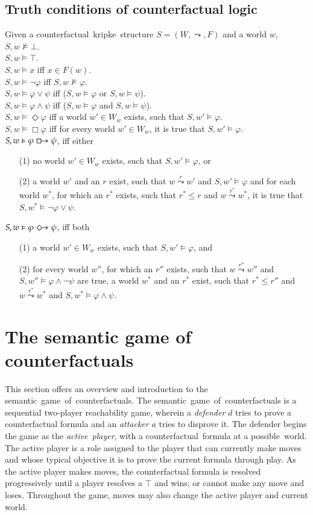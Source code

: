 \documentclass[a4paper,american]{paper}
\theoremstyle{definition}\newtheorem{definition}{Definition}
\begin{document}
\subsection{Truth conditions of counterfactual logic}
Given a counterfactual~kripke~structure $S = (W, \leadsto ,F)$ and a world $w$,\\
$S,w\nvDash\bot$.\\
$S,w\vDash\top$.\\
$S,w\vDash x$ iff $x\in F(w)$.\\
$S,w\vDash \neg\varphi$ iff $S,w\nvDash\varphi$.\\
$S,w\vDash \varphi\vee\psi$ iff ($S,w\vDash\varphi$ or $S,w\vDash\psi$).\\
$S,w\vDash \varphi\wedge\psi$ iff ($S,w\vDash\varphi$ and $S,w\vDash\psi$).\\
$S,w\vDash \Diamond \varphi$ iff a world $w'\in W_w$ exists, such that $S,w' \vDash \varphi$.\\
$S,w\vDash \Box \varphi$ iff for every world $w'\in W_w$, it is true that $S,w' \vDash \varphi$.\\
$S,w \vDash \varphi \boxright \psi$, iff either
\begin{itemize}
	\item[(1)] no world $w'\in W_w$ exists, such that $S,w' \vDash \varphi$, or
	\item[(2)] a world $w'$ and an $r$ exist, such that $w\overset{r}{\leadsto} w'$ and $S,w'\vDash \varphi$ and for each world $w^*$, for which an $r^*$ exists, such that $r^*\leq r$ and $w\overset{r^*}{\leadsto} w^*$, it is true that $S,w^*\vDash\neg\varphi\vee\psi$.
\end{itemize}
\noindent$S,w\vDash \varphi \Diamondright \psi$, iff both 
\begin{itemize}
	\item[(1)] a world $w'\in W_w$ exists, such that $S,w' \vDash \varphi$, and
	\item[(2)] for every world $w''$, for which an $r''$ exists, such that $w\overset{r''}{\leadsto}w''$ and $S,w'' \vDash \varphi\wedge\neg\psi$ are true, a world $w^*$ and an $r^*$ exist, such that $r^* \leq r''$ and $w\overset{r^*}{\leadsto}w^*$ and $S,w^* \vDash \varphi\wedge\psi$.
\end{itemize}
\section{The semantic game of counterfactuals}
This section offers an overview and introduction to the semantic~game~of~counterfactuals. The semantic~game~of~counterfactuals is a sequential two-player reachability game, wherein a \textit{defender} $d$ tries to prove a counterfactual formula and an \textit{attacker} $a$ tries to disprove it. The defender begins the game as the \textit{active~player}, with a counterfactual~formula at a possible~world. The active player is a role assigned to the player that can currently make moves and whose typical objective it is to prove the current formula through play. As the active player makes moves, the counterfactual formula is resolved progressively until a player resolves a $\top$ and wins; or cannot make any move and loses. Throughout the game, moves may also change the active player and current world.
\end{document}
